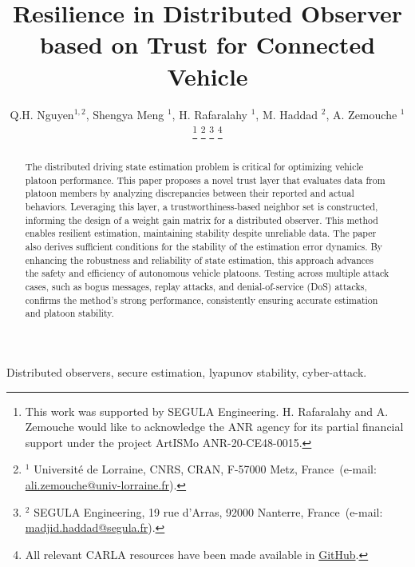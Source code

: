 \documentclass[letterpaper, 10pt, conference]{ieeeconf}  %
\begin{document}
\title{\bf Resilience in Distributed
 Observer based on Trust for Connected Vehicle }
\author{Q.H. Nguyen$^{1,2}$, Shengya Meng $^{1}$, H. Rafaralahy $^{1}$, M. Haddad $^{2}$, A. Zemouche $^{1}$
%
\thanks{This work was supported by SEGULA Engineering. H. Rafaralahy and A. Zemouche would like to acknowledge the ANR agency for its partial financial support under the project ArtISMo ANR-20-CE48-0015.
}
%
\thanks{$^{1}$ Universit\'e de Lorraine, CNRS, CRAN, F-57000 Metz, France~(e-mail: \protect\url{ali.zemouche@univ-lorraine.fr}).}
%
\thanks{$^{2}$ SEGULA Engineering, 19 rue d'Arras, 92000 Nanterre, France~(e-mail: \protect\url{madjid.haddad@segula.fr}).}
%
\thanks{All relevant CARLA resources have been made available in \protect\href{https://github.com/kslhuy/CACC_UIO_simulink}{GitHub}.}
}
\maketitle

\begin{abstract}
The distributed driving state estimation problem is critical for optimizing vehicle platoon performance. This paper proposes a novel trust layer that evaluates data from platoon members by analyzing discrepancies between their reported and actual behaviors. Leveraging this layer, a trustworthiness-based neighbor set is constructed, informing the design of a weight gain matrix for a distributed observer. This method enables resilient estimation, maintaining stability despite unreliable data. The paper also derives sufficient conditions for the stability of the estimation error dynamics. By enhancing the robustness and reliability of state estimation, this approach advances the safety and efficiency of autonomous vehicle platoons. Testing across multiple attack cases, such as bogus messages, replay attacks, and denial-of-service (DoS) attacks, confirms the method's strong performance, consistently ensuring accurate estimation and platoon stability.
\end{abstract}

\begin{keywords}
Distributed observers, secure estimation, lyapunov stability, cyber-attack.
\end{keywords}
\end{document}
